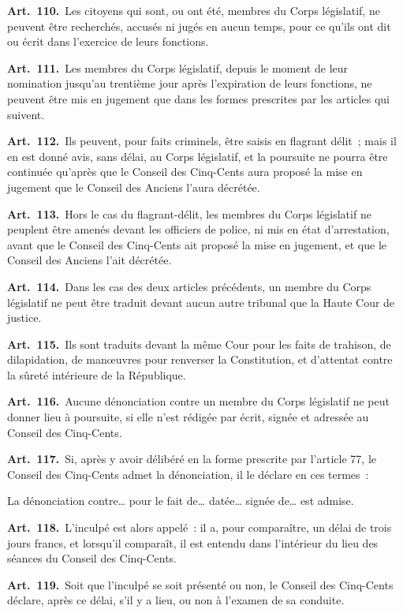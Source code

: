 \documentclass[french,twoside]{book} %
\newcommand{\labelchar}[1]{\textbf{\color{rubric} #1}}
\begin{document}
\labelchar{Art. 110.} Les citoyens qui sont, ou ont été, membres du Corps législatif, ne peuvent être recherchés, accusés ni jugés en aucun temps, pour ce qu’ils ont dit ou écrit dans l’exercice de leurs fonctions.\par
\labelchar{Art. 111.} Les membres du Corps législatif, depuis le moment de leur nomination jusqu’au trentième jour après l’expiration de leurs fonctions, ne peuvent être mis en jugement que dans les formes prescrites par les articles qui suivent.\par
\labelchar{Art. 112.} Ils peuvent, pour faits criminels, être saisis en flagrant délit ; mais il en est donné avis, sans délai, au Corps législatif, et la poursuite ne pourra être continuée qu’après que le Conseil des Cinq-Cents aura proposé la mise en jugement que le Conseil des Anciens l’aura décrétée.\par
\labelchar{Art. 113.} Hors le cas du flagrant-délit, les membres du Corps législatif ne peuplent être amenés devant les officiers de police, ni mis en état d’arrestation, avant que le Conseil des Cinq-Cents ait proposé la mise en jugement, et que le Conseil des Anciens l’ait décrétée.\par
\labelchar{Art. 114.} Dans les cas des deux articles précédents, un membre du Corps législatif ne peut être traduit devant aucun autre tribunal que la Haute Cour de justice.\par
\labelchar{Art. 115.} Ils sont traduits devant la même Cour pour les faits de trahison, de dilapidation, de manœuvres pour renverser la Constitution, et d’attentat contre la sûreté intérieure de la République.\par
\labelchar{Art. 116.} Aucune dénonciation contre un membre du Corps législatif ne peut donner lieu à poursuite, si elle n’est rédigée par écrit, signée et adressée au Conseil des Cinq-Cents.\par
\labelchar{Art. 117.} Si, après y avoir délibéré en la forme prescrite par l’article 77, le Conseil des Cinq-Cents admet la dénonciation, il le déclare en ces termes :\par
La dénonciation contre… pour le fait de… datée… signée de… est admise.\par
\labelchar{Art. 118.} L’inculpé est alors appelé : il a, pour comparaître, un délai de trois jours francs, et lorsqu’il comparaît, il est entendu dans l’intérieur du lieu des séances du Conseil des Cinq-Cents.\par
\labelchar{Art. 119.} Soit que l’inculpé se soit présenté ou non, le Conseil des Cinq-Cents déclare, après ce délai, s’il y a lieu, ou non à l’examen de sa conduite.\par
\end{document}
